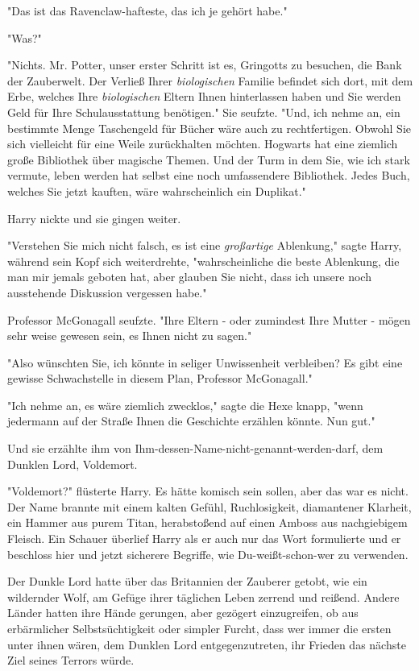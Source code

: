 {"Das ist das Ravenclaw-hafteste, das ich je gehört habe."

"Was?"

"Nichts. Mr. Potter, unser erster Schritt ist es, Gringotts zu besuchen, die Bank der Zauberwelt. Der Verließ Ihrer \emph{biologischen} Familie befindet sich dort, mit dem Erbe, welches Ihre \emph{biologischen} Eltern Ihnen hinterlassen haben und Sie werden Geld für Ihre Schulausstattung benötigen." Sie seufzte. "Und, ich nehme an, ein bestimmte Menge Taschengeld für Bücher wäre auch zu rechtfertigen. Obwohl Sie sich vielleicht für eine Weile zurückhalten möchten. Hogwarts hat eine ziemlich große Bibliothek über magische Themen. Und der Turm in dem Sie, wie ich stark vermute, leben werden hat selbst eine noch umfassendere Bibliothek. Jedes Buch, welches Sie jetzt kauften, wäre wahrscheinlich ein Duplikat."

Harry nickte und sie gingen weiter.

"Verstehen Sie mich nicht falsch, es ist eine \emph{großartige} Ablenkung," sagte Harry, während sein Kopf sich weiterdrehte, "wahrscheinliche die beste Ablenkung, die man mir jemals geboten hat, aber glauben Sie nicht, dass ich unsere noch ausstehende Diskussion vergessen habe."

Professor McGonagall seufzte. "Ihre Eltern - oder zumindest Ihre Mutter - mögen sehr weise gewesen sein, es Ihnen nicht zu sagen."

"Also wünschten Sie, ich könnte in seliger Unwissenheit verbleiben? Es gibt eine gewisse Schwachstelle in diesem Plan, Professor McGonagall."

"Ich nehme an, es wäre ziemlich zwecklos," sagte die Hexe knapp, "wenn jedermann auf der Straße Ihnen die Geschichte erzählen könnte. Nun gut."

Und sie erzählte ihm von Ihm-dessen-Name-nicht-genannt-werden-darf, dem Dunklen Lord, Voldemort.

"Voldemort?" flüsterte Harry. Es hätte komisch sein sollen, aber das war es nicht. Der Name brannte mit einem kalten Gefühl, Ruchlosigkeit, diamantener Klarheit, ein Hammer aus purem Titan, herabstoßend auf einen Amboss aus nachgiebigem Fleisch. Ein Schauer überlief Harry als er auch nur das Wort formulierte und er beschloss hier und jetzt sicherere Begriffe, wie Du-weißt-schon-wer zu verwenden.

Der Dunkle Lord hatte über das Britannien der Zauberer getobt, wie ein wildernder Wolf, am Gefüge ihrer täglichen Leben zerrend und reißend. Andere Länder hatten ihre Hände gerungen, aber gezögert einzugreifen, ob aus erbärmlicher Selbstsüchtigkeit oder simpler Furcht, dass wer immer die ersten unter ihnen wären, dem Dunklen Lord entgegenzutreten, ihr Frieden das nächste Ziel seines Terrors würde.

}
